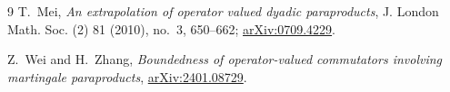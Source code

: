 \documentclass[11pt]{article}
\begin{document}
\begin{thebibliography}{9}
T.~Mei,
\emph{An extrapolation of operator valued dyadic paraproducts},
J. London Math. Soc. (2) 81 (2010), no.~3, 650--662;
\href{https://arxiv.org/abs/0709.4229}{arXiv:0709.4229}.

Z.~Wei and H.~Zhang,
\emph{Boundedness of operator-valued commutators involving martingale
paraproducts},
\href{https://arxiv.org/abs/2401.08729}{arXiv:2401.08729}.
\end{thebibliography}
\end{document}
